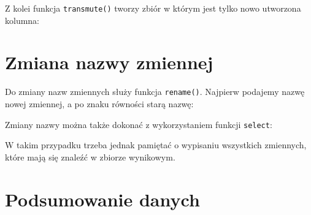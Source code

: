 \documentclass[]{book}
\newenvironment{Shaded}{\begin{snugshade}}{\end{snugshade}}
\newcommand{\KeywordTok}[1]{\textcolor[rgb]{0.13,0.29,0.53}{\textbf{#1}}}
\newcommand{\DataTypeTok}[1]{\textcolor[rgb]{0.13,0.29,0.53}{#1}}
\newcommand{\DecValTok}[1]{\textcolor[rgb]{0.00,0.00,0.81}{#1}}
\newcommand{\StringTok}[1]{\textcolor[rgb]{0.31,0.60,0.02}{#1}}
\newcommand{\OperatorTok}[1]{\textcolor[rgb]{0.81,0.36,0.00}{\textbf{#1}}}
\newcommand{\NormalTok}[1]{#1}
\begin{document}
Z kolei funkcja \texttt{transmute()} tworzy zbiór w którym jest tylko
nowo utworzona kolumna:

\begin{Shaded}
\end{Shaded}

\section{Zmiana nazwy zmiennej}\label{zmiana-nazwy-zmiennej}

Do zmiany nazw zmiennych służy funkcja \texttt{rename()}. Najpierw
podajemy nazwę nowej zmiennej, a po znaku równości starą nazwę:

\begin{Shaded}
\end{Shaded}

Zmiany nazwy można także dokonać z wykorzystaniem funkcji
\texttt{select}:

\begin{Shaded}
\end{Shaded}

W takim przypadku trzeba jednak pamiętać o wypisaniu wszystkich
zmiennych, które mają się znaleźć w zbiorze wynikowym.

\section{Podsumowanie danych}\label{podsumowanie-danych}
\end{document}

